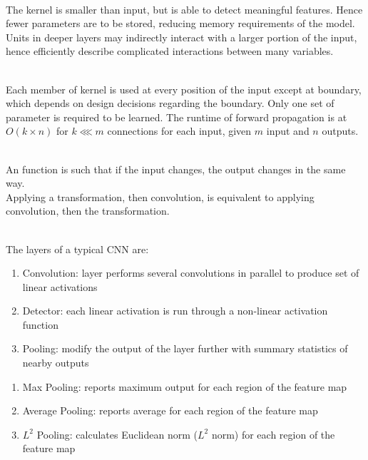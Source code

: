 \begin{remark} \\
The kernel is smaller than input, but is able to detect meaningful features. Hence fewer parameters are to be stored, reducing memory requirements of the model. Units in deeper layers may indirectly interact with a larger portion of the input, hence efficiently describe complicated interactions between many variables.
\end{remark}

\begin{remark} \\
Each member of kernel is used at every position of the input except at boundary, which depends on design decisions regarding the boundary. Only one set of parameter is required to be learned. The runtime of forward propagation is at $O(k \times n)$ for $k \lll m$ connections for each input, given $m$ input and $n$ outputs.
\end{remark}

\begin{remark} \\
An  function is such that if the input changes, the output changes in the same way.\\
Applying a transformation, then convolution, is equivalent to applying convolution, then the transformation.
\end{remark}

\begin{remark} \\
The layers of a typical CNN are:
\begin{enumerate}[label=\roman*.]
\setlength{\itemsep}{0pt}
\item Convolution: layer performs several convolutions in parallel to produce set of linear activations
\item Detector: each linear activation is run through a non-linear activation function
\item Pooling: modify the output of the layer further with summary statistics of nearby outputs
\end{enumerate}
\end{remark}

\begin{example} 
\begin{enumerate}[label=\roman*.]
\setlength{\itemsep}{0pt}
\item Max Pooling: reports maximum output for each region of the feature map
\item Average Pooling: reports average for each region of the feature map
\item $L^2$ Pooling: calculates Euclidean norm ($L^2$ norm) for each region of the feature map
\end{enumerate}
\end{example}

